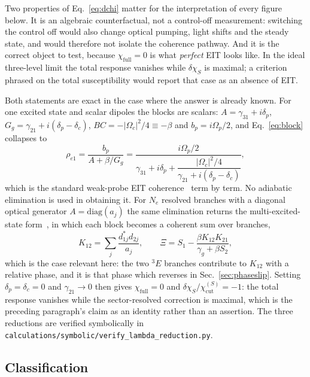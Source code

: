 \documentclass[
  reprint,
  amsmath,amssymb,
  aps,pra,
  superscriptaddress,
  floatfix,
]{revtex4-2}
\newcommand{\dchi}{\delta\chi_{S}}
\begin{document}
Two properties of Eq.~\eqref{eq:dchi} matter for the interpretation of every
figure below. It is an algebraic counterfactual, not a control-off
measurement: switching the control off would also change optical pumping,
light shifts and the steady state, and would therefore not isolate the
coherence pathway. And it is the correct object to test, because
$\chi_{\mathrm{full}}=0$ is what \emph{perfect} EIT looks like. In the ideal
three-level limit the total response vanishes while $\dchi$ is maximal; a
criterion phrased on the total susceptibility would report that case as an
absence of EIT.

Both statements are exact in the case where the answer is already known. For
one excited state and scalar dipoles the blocks are scalars: $A=\gamma_{31}+i
\delta_{p}$, $G_{g}=\gamma_{21}+i(\delta_{p}-\delta_{c})$,
$BC=-|\Omega_{c}|^{2}/4\equiv-\beta$ and $b_{p}=i\Omega_{p}/2$, and
Eq.~\eqref{eq:block} collapses to
%
\begin{equation}
\rho_{e1}=\frac{b_{p}}{A+\beta/G_{g}}
=\frac{i\Omega_{p}/2}
{\gamma_{31}+i\delta_{p}
+\dfrac{|\Omega_{c}|^{2}/4}{\gamma_{21}+i(\delta_{p}-\delta_{c})}},
\label{eq:textbook}
\end{equation}
%
which is the standard weak-probe EIT coherence~\cite{M2005C01} term by term.
No adiabatic elimination is used in obtaining it. For $N_{e}$ resolved
branches with a diagonal optical generator $A=\mathrm{diag}(a_{j})$ the same
elimination returns the multi-excited-state form~\cite{O2011C04}, in which
each block becomes a coherent sum over branches,
%
\begin{equation}
K_{12}=\sum_{j}\frac{d_{1j}^{*}d_{2j}}{a_{j}},
\qquad
\Xi=S_{1}-\frac{\beta K_{12}K_{21}}{\gamma_{g}+\beta S_{2}},
\label{eq:multilevel}
\end{equation}
%
which is the case relevant here: the two $^{3}E$ branches contribute to
$K_{12}$ with a relative phase, and it is that phase which reverses in
Sec.~\ref{sec:phaseslip}. Setting
$\delta_{p}=\delta_{c}=0$ and $\gamma_{21}\to0$ then gives
$\chi_{\mathrm{full}}=0$ and $\dchi/\chi^{(S)}_{\mathrm{cut}}=-1$: the total
response vanishes while the sector-resolved correction is maximal, which is
the preceding paragraph's claim as an identity rather than an assertion. The
three reductions are verified symbolically in
\texttt{calculations/symbolic/verify\_lambda\_reduction.py}.

\subsection{Classification}
\end{document}
